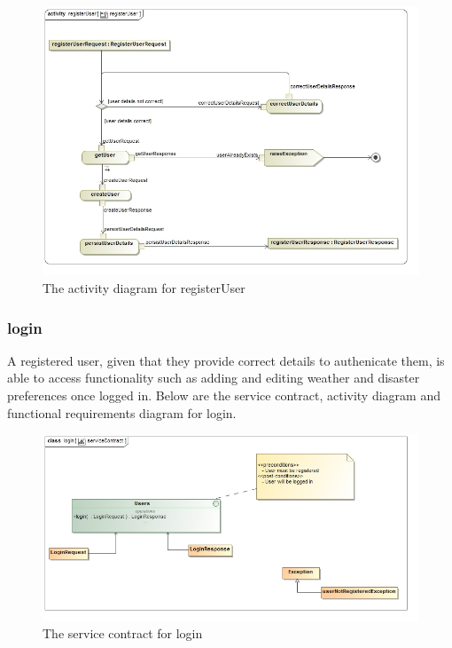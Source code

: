 \begin{figure}[H]
	\centering
	\includegraphics[width=1.0\textwidth]{../images/funcReq/registerUserActivityDiagram.jpg}
	\caption{The activity diagram for registerUser \label{overflow}}
\end{figure}

\subsubsection{login}

A registered user, given that they provide correct details to authenicate them, is able to access functionality such as adding and editing weather and disaster preferences once logged in. Below are the service contract, activity diagram and functional requirements diagram for login.

\begin{figure}[H]
	\centering
	\includegraphics[width=1.0\textwidth]{../images/funcReq/loginServiceContract.jpg}
	\caption{The service contract for login \label{overflow}}
\end{figure}

